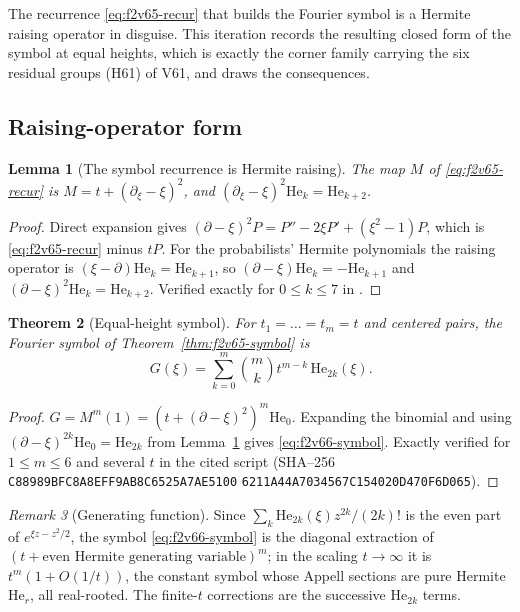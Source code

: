 \documentclass[11pt]{article}
\newtheorem{theorem}{Theorem}[section]
\newtheorem{lemma}[theorem]{Lemma}
\theoremstyle{definition}
\theoremstyle{remark}
\newtheorem{remark}[theorem]{Remark}
\begin{document}
The recurrence \eqref{eq:f2v65-recur} that builds the Fourier symbol is a
Hermite raising operator in disguise.  This iteration records the
resulting closed form of the symbol at equal heights, which is exactly
the corner family carrying the six residual groups (H61) of V61, and
draws the consequences.

\subsection{Raising-operator form}

\begin{lemma}[The symbol recurrence is Hermite raising]
\label{lem:f2v66-raise}
The map \(M\) of \eqref{eq:f2v65-recur} is \(M=t+(\partial_\xi-\xi)^2\),
and \((\partial_\xi-\xi)^2\mathrm{He}_k=\mathrm{He}_{k+2}\).
\end{lemma}

\begin{proof}
Direct expansion gives
\((\partial-\xi)^2P=P''-2\xi P'+(\xi^2-1)P\), which is
\eqref{eq:f2v65-recur} minus \(tP\).  For the probabilists' Hermite
polynomials the raising operator is \((\xi-\partial)\mathrm{He}_k=\mathrm{He}_{k+1}\),
so \((\partial-\xi)\mathrm{He}_k=-\mathrm{He}_{k+1}\) and
\((\partial-\xi)^2\mathrm{He}_k=\mathrm{He}_{k+2}\).  Verified exactly for
\(0\le k\le7\) in .
\end{proof}

\begin{theorem}[Equal-height symbol]
\label{thm:f2v66-symbol}
For \(t_1=\dots=t_m=t\) and centered pairs, the Fourier symbol of
Theorem~\ref{thm:f2v65-symbol} is
\begin{equation}
 \boxed{\,G(\xi)=\sum_{k=0}^m\binom mk t^{m-k}\,\mathrm{He}_{2k}(\xi).}
 \label{eq:f2v66-symbol}
\end{equation}
\end{theorem}

\begin{proof}
\(G=M^m(1)=(t+(\partial-\xi)^2)^m\mathrm{He}_0\).  Expanding the
binomial and using \((\partial-\xi)^{2k}\mathrm{He}_0=\mathrm{He}_{2k}\)
from Lemma~\ref{lem:f2v66-raise} gives \eqref{eq:f2v66-symbol}.  Exactly
verified for \(1\le m\le6\) and several \(t\) in the cited script
(SHA--256 \texttt{C88989BFC8A8EFF9AB8C6525A7AE5100}\allowbreak
\texttt{6211A44A7034567C154020D470F6D065}).
\end{proof}

\begin{remark}[Generating function]
\label{rem:f2v66-genfun}
Since \(\sum_{k}\mathrm{He}_{2k}(\xi)z^{2k}/(2k)!\) is the even part of
\(e^{\xi z-z^2/2}\), the symbol \eqref{eq:f2v66-symbol} is the diagonal
extraction of \((t+\text{even Hermite generating variable})^m\); in the
scaling \(t\to\infty\) it is \(t^m(1+O(1/t))\), the constant symbol whose
Appell sections are pure Hermite \(\mathrm{He}_r\), all real-rooted.  The
finite-\(t\) corrections are the successive \(\mathrm{He}_{2k}\) terms.
\end{remark}
\end{document}
